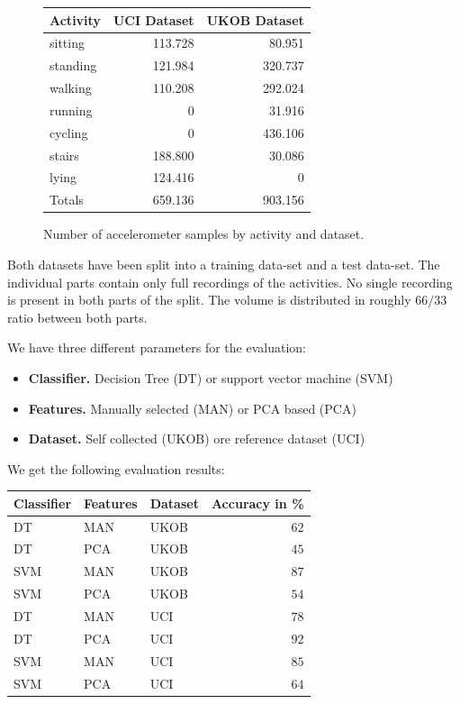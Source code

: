 \begin{figure}[h]
\centering
\begin{tabular}{|l|r|r|} \hline
Activity  & UCI Dataset & UKOB Dataset \\ \hline
sitting   & 113.728     & 80.951        \\
standing  & 121.984     & 320.737       \\
walking   & 110.208     & 292.024       \\
running   & 0           & 31.916        \\
cycling   & 0           & 436.106       \\
stairs    & 188.800     & 30.086        \\
lying     & 124.416     & 0            \\ \hline \hline
Totals    & 659.136     & 903.156       \\ \hline
\end{tabular}
\caption{Number of accelerometer samples by activity and dataset.}
\label{fig:har_datasets}
\end{figure}

Both datasets have been split into a training data-set and a test
data-set. The individual parts contain only full recordings of the
activities. No single recording is present in both parts of the
split. The volume is distributed in roughly $66/33$ ratio between
both parts.

We have three different parameters for the evaluation:
\begin{itemize}
\item {\bf Classifier.} Decision Tree (DT) or support vector machine (SVM)
\item {\bf Features.} Manually selected (MAN) or PCA based (PCA)
\item {\bf Dataset.} Self collected (UKOB) ore reference dataset (UCI)
\end{itemize}

We get the following evaluation results:
\begin{center}
\begin{tabular}{|lll|r|} \hline
  {\bf Classifier} & {\bf Features} & {\bf Dataset} & {\bf Accuracy in \%} \\ \hline
  DT	& MAN	& UKOB	&	$62$ \\ 
  DT	& PCA	& UKOB	&	$45$\\ 
  SVM	& MAN	& UKOB	&	$87$\\ 
  SVM	& PCA	& UKOB	&	$54$\\
  DT	& MAN	& UCI	&	$78$ \\ 
  DT	& PCA	& UCI	&	$92$ \\ 
  SVM	& MAN	& UCI	&	$85$ \\ 
  SVM	& PCA	& UCI	&	$64$ \\ \hline
\end{tabular}
\end{center}

